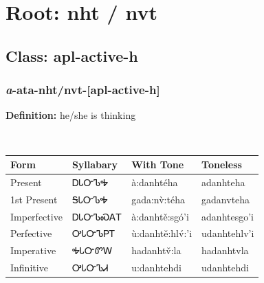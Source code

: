 \needspace{4in}
\section*{Root: nht / nvt}
\nopagebreak
{}
\needspace{3in}
\subsection*{Class: apl-active-h}
\nopagebreak
\needspace{2in}
\subsubsection*{\textit{a}{-}ata{-}\textbf{nht/nvt}{-}[apl-active-h]}
\nopagebreak
\textbf{Definition: } he/she is thinking
\\[0.5em]
\begin{tabularx}{\textwidth}{l X X X}%
\toprule%
\textbf{Form}&\textbf{Syllabary}&\textbf{With Tone}&\textbf{Toneless}\\%
\midrule%
Present&ᎠᏓᏅᏖᎭ&à:danhtéha&adanhteha\\%
1st Present&ᎦᏓᏅᏖᎭ&gada:nv̀:téha&gadanvteha\\%
Imperfective&ᎠᏓᏅᏖᏍᎪᎢ&à:danhtě:sgó’i&adanhtesgo’i\\%
Perfective&ᎤᏓᏅᏖᏢᎢ&ù:danhtě:hlv́:’i&udanhtehlv’i\\%
Imperative&ᎭᏓᏅᏛᎳ&hadanhtv̌:la&hadanhtvla\\%
Infinitive&ᎤᏓᏅᏖᏗ&u:danhtehdi&udanhtehdi\\%
\bottomrule%
\end{tabularx}
\\[1em]